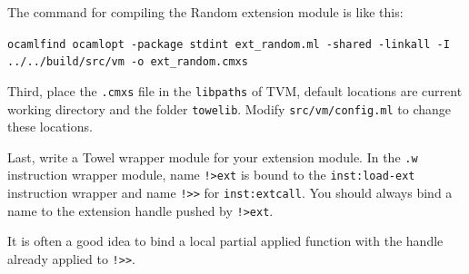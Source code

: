\documentclass{report}
\newcommand{\inst}[1] {\texttt{inst:#1}}
\begin{document}
The command for compiling the Random extension module is like this:

\begin{mdframed}[style=example]
  \texttt{ocamlfind ocamlopt -package stdint ext\_random.ml -shared
    -linkall -I ../../build/src/vm -o ext\_random.cmxs}
\end{mdframed}

Third, place the \texttt{.cmxs} file in the \texttt{libpaths} of TVM, default locations are current working directory and the folder \texttt{towelib}. Modify \texttt{src/vm/config.ml} to change these locations.

Last, write a Towel wrapper module for your extension module. In the \texttt{.w} instruction wrapper module, name \texttt{!>ext} is bound to the \inst{load-ext} instruction wrapper and name \texttt{!>>} for \inst{extcall}. You should always bind a name to the extension handle pushed by \texttt{!>ext}.


\begin{mdframed}[style=hint]
  It is often a good idea to bind a local partial applied function with the handle already applied to \texttt{!>>}.
\end{mdframed}
\end{document}
